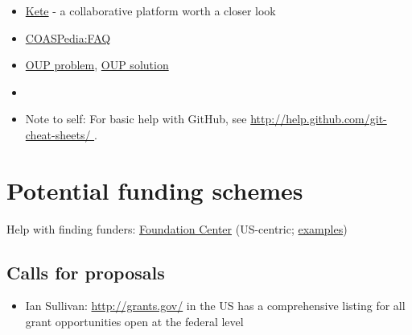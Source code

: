 \documentclass[final,authoryear,3p]{elsarticle-open-drafting}
\begin{document}
\begin{itemize}
	\item \href{http://kete.net.nz/}{Kete} - a collaborative platform worth a closer look
	\item \href{http://www.science3point0.com/coaspedia/index.php/COASPedia:FAQ}{COASPedia:FAQ}
	\item \href{http://www.timeshighereducation.co.uk/story.asp?sectioncode=26&storycode=416531&c=2}{OUP problem}, \href{http://www.timeshighereducation.co.uk/story.asp?storycode=416608}{OUP solution}
	\item \href{http://friendfeed.com/oatp/ffa8e3c0/funding-for-sustainability-how-funders}{}
	\item Note to self: For basic help with GitHub, see \href{http://help.github.com/git-cheat-sheets/}{http://help.github.com/git-cheat-sheets/ } .
\end{itemize}


\section{Potential funding schemes}

Help with finding funders: \href{http://www.foundationcenter.org/}{Foundation Center} (US-centric; \href{http://maps.foundationcenter.org/glasspockets/transparency.php#}{examples})

\subsection{Calls for proposals}
\begin{itemize}
	\item Ian Sullivan: \href{http://grants.gov/}{http://grants.gov/}  in the US has a comprehensive listing for all grant opportunities open at the federal level
\end{itemize}
\end{document}

